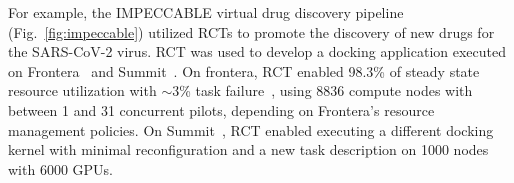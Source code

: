 \documentclass[preprint,12pt, a4paper]{elsarticle}
\begin{document}

For example, the IMPECCABLE virtual drug discovery
pipeline~\cite{saadi2021impeccable} (Fig.~\ref{fig:impeccable}) utilized RCTs to
promote the discovery of new drugs for the SARS-CoV-2 virus. RCT was used to develop a docking
application executed
on Frontera~\cite{stanzione2020frontera} and Summit~\cite{}.
On frontera, RCT enabled 98.3\% of steady state resource utilization with
$\sim$3\% task failure~\cite{merzky2022raptor}, using 8836 compute nodes with
between 1 and 31 concurrent pilots, depending on Frontera's resource management
policies. On Summit~\cite{luo2020pre}, RCT enabled executing a different docking
kernel with minimal reconfiguration and a new task description on 1000 nodes
with 6000 GPUs.



\end{document}
